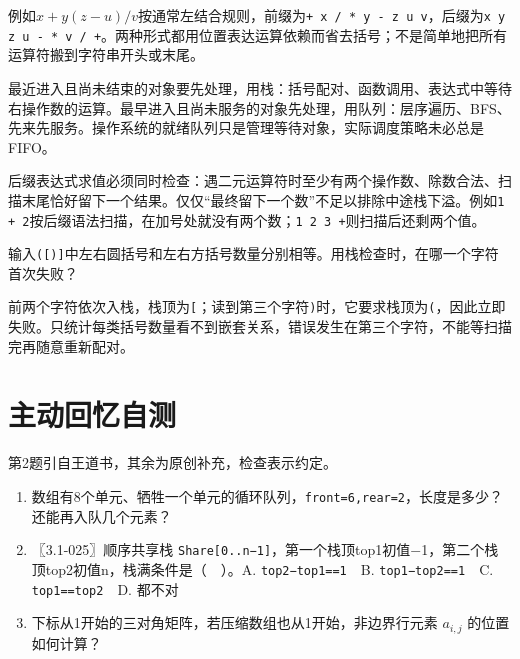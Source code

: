 例如\(x+y(z-u)/v\)按通常左结合规则，前缀为\texttt{+\allowbreak{} x /\allowbreak{} *\allowbreak{} y - z u v}，后缀为\texttt{x y z u - *\allowbreak{} v /\allowbreak{} +\allowbreak{}}。两种形式都用位置表达运算依赖而省去括号；不是简单地把所有运算符搬到字符串开头或末尾。

\begin{methodbox}[按尚未完成对象的次序选结构]

最近进入且尚未结束的对象要先处理，用栈：括号配对、函数调用、表达式中等待右操作数的运算。最早进入且尚未服务的对象先处理，用队列：层序遍历、BFS、先来先服务。操作系统的就绪队列只是管理等待对象，实际调度策略未必总是FIFO。

\end{methodbox}

后缀表达式求值必须同时检查：遇二元运算符时至少有两个操作数、除数合法、扫描末尾恰好留下一个结果。仅仅``最终留下一个数''不足以排除中途栈下溢。例如\texttt{1 +\allowbreak{} 2}按后缀语法扫描，在加号处就没有两个数；\texttt{1 2 3 +\allowbreak{}}则扫描后还剩两个值。

\begin{example}[自拟：括号数量正确仍可失败]

输入\texttt{(\allowbreak{}[)\allowbreak{}]}中左右圆括号和左右方括号数量分别相等。用栈检查时，在哪一个字符首次失败？

\end{example}

前两个字符依次入栈，栈顶为\texttt{[}；读到第三个字符\texttt{)\allowbreak{}}时，它要求栈顶为\texttt{(\allowbreak{}}，因此立即失败。只统计每类括号数量看不到嵌套关系，错误发生在第三个字符，不能等扫描完再随意重新配对。

\section{主动回忆自测}\label{DS03-check}

第2题引自王道书，其余为原创补充，检查表示约定。

\begin{enumerate}
\def\labelenumi{\arabic{enumi}.}
\tightlist
\item
  数组有8个单元、牺牲一个单元的循环队列，\texttt{front=\allowbreak{}6,\allowbreak{}rear=\allowbreak{}2}，长度是多少？还能再入队几个元素？
\item
  〖3.1-025〗顺序共享栈 \texttt{Share[0..n−1]}，第一个栈顶top1初值\ensuremath{-}1，第二个栈顶top2初值n，栈满条件是（　）。A. \texttt{top2−top1=\allowbreak{}=\allowbreak{}1}　B. \texttt{top1−top2=\allowbreak{}=\allowbreak{}1}　C. \texttt{top1=\allowbreak{}=\allowbreak{}top2}　D. 都不对
\item
  下标从1开始的三对角矩阵，若压缩数组也从1开始，非边界行元素 \(a_{i,j}\) 的位置如何计算？
\end{enumerate}

